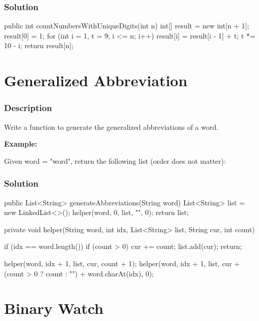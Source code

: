 \subsubsection{Solution}

\begin{Code}
public int countNumbersWithUniqueDigits(int n) {
    int[] result = new int[n + 1];
    result[0] = 1;
    for (int i = 1, t = 9; i <= n; i++) {
        result[i] = result[i - 1] + t;
        t *= 10 - i;
    }
    return result[n];
}
\end{Code}

\newpage

\section{Generalized Abbreviation} %

\subsubsection{Description}
Write a function to generate the generalized abbreviations of a word.

\textbf{Example:}

Given word = "word", return the following list (order does not matter):


\subsubsection{Solution}

\begin{Code}
public List<String> generateAbbreviations(String word) {
    List<String> list = new LinkedList<>();
    helper(word, 0, list, "", 0);
    return list;
}

private void helper(String word, int idx, List<String> list, String cur, int count) {
    if (idx == word.length()) {
        if (count > 0) {
            cur += count;
        }
        list.add(cur);
        return;
    }

    helper(word, idx + 1, list, cur, count + 1);
    helper(word, idx + 1, list, cur + (count > 0 ? count : "") + word.charAt(idx), 0);
}
\end{Code}

\newpage

\section{Binary Watch} %

